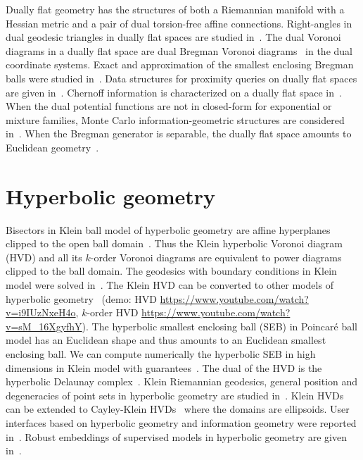 \documentclass[11pt]{article}
\begin{document}
Dually flat geometry has the structures of both a Riemannian manifold with a Hessian metric and a pair of dual torsion-free affine connections.
Right-angles in dual geodesic triangles in dually flat spaces are studied in~\cite{nielsen2021geodesic}.
The dual Voronoi diagrams in a dually flat space are dual Bregman Voronoi diagrams~\cite{boissonnat2010bregman} in the dual coordinate systems.
Exact and approximation of the smallest enclosing Bregman balls were studied in~\cite{nock2005fitting,nielsen2008smallest}.
Data structures for proximity queries on dually flat spaces are given in~\cite{nielsen2009tailored,nielsen2009bregman}.
Chernoff information is characterized on a dually flat space in~\cite{nielsen2013information,nielsen2013hypothesis}.
When the dual potential functions are not in closed-form for exponential or mixture families, Monte Carlo information-geometric structures are considered in~\cite{nielsen2019monte}.
When the Bregman generator is separable, the dually flat space amounts to Euclidean geometry~\cite{gomes2018geometry}.





\section*{Hyperbolic geometry}
Bisectors in Klein ball model of hyperbolic geometry are affine hyperplanes clipped to the open ball domain~\cite{nielsen2010hyperbolic}.
Thus the Klein hyperbolic Voronoi diagram (HVD) and all its $k$-order Voronoi diagrams are equivalent to  power diagrams clipped to the ball domain.
The geodesics with boundary conditions in Klein model were solved in~\cite{nielsen2012hyperbolic}.
The Klein HVD can be converted to other models of hyperbolic geometry~\cite{nielsen2014visualizing} (demo: HVD \url{https://www.youtube.com/watch?v=i9IUzNxeH4o}, $k$-order HVD \url{https://www.youtube.com/watch?v=sM_16XgyfhY}). 
The hyperbolic smallest enclosing  ball (SEB) in Poincar\'e ball model has an Euclidean shape and thus amounts to an Euclidean smallest enclosing ball.
We can compute numerically the hyperbolic SEB in high dimensions in Klein model with guarantees~\cite{nielsen2015approximating}.
The dual of the HVD is the hyperbolic Delaunay complex~\cite{nielsen2020voronoi}. 
Klein Riemannian geodesics, general position and degeneracies of point sets in hyperbolic geometry are studied in~\cite{nielsen2014further}.
Klein HVDs can be extended to Cayley-Klein HVDs~\cite{nielsen2016classification} where the domains are ellipsoids.
User interfaces based on hyperbolic geometry and information geometry were reported in~\cite{nock2013information}.
Robust embeddings of supervised models in hyperbolic geometry are given in~\cite{neurips-2024}.
\end{document}
